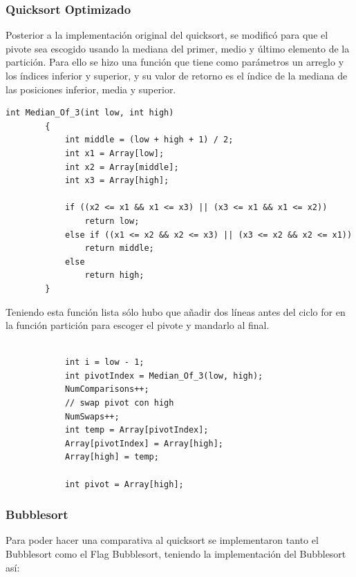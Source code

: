 \documentclass[conference]{IEEEtran}
\begin{document}
\subsubsection{Quicksort Optimizado}
Posterior a la implementación original del quicksort, se modificó para que el pivote sea escogido usando la mediana del primer, medio y último elemento de la partición.
Para ello se hizo una función que tiene como parámetros un arreglo y los índices inferior y superior, y su valor de retorno es el índice de la mediana de las posiciones inferior, media y superior.
\begin{verbatim}
int Median_Of_3(int low, int high)
        {
            int middle = (low + high + 1) / 2;
            int x1 = Array[low];
            int x2 = Array[middle];
            int x3 = Array[high];

            if ((x2 <= x1 && x1 <= x3) || (x3 <= x1 && x1 <= x2))
                return low;
            else if ((x1 <= x2 && x2 <= x3) || (x3 <= x2 && x2 <= x1))
                return middle;
            else
                return high;
        }
\end{verbatim}
Teniendo esta función lista sólo hubo que añadir dos líneas antes del ciclo for en la función partición para escoger el pivote y mandarlo al final.
\begin{verbatim}

            int i = low - 1;
            int pivotIndex = Median_Of_3(low, high);
            NumComparisons++;
            // swap pivot con high
            NumSwaps++;
            int temp = Array[pivotIndex];
            Array[pivotIndex] = Array[high];
            Array[high] = temp;

            int pivot = Array[high];
\end{verbatim}

\subsubsection{Bubblesort}
Para poder hacer una comparativa al quicksort se implementaron tanto el Bubblesort como el Flag Bubblesort, teniendo la implementación del Bubblesort así:
\end{document}
